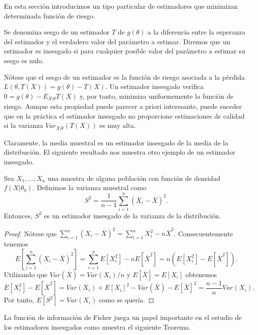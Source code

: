     En esta sección introducimos un tipo particular de estimadores que minimizan determinada función de riesgo.

    \begin{definition}
        Se denomina sesgo de un estimador $T$ de $g(\theta)$ a la diferencia entre la esperanza del estimador y el verdadero valor del parámetro a estimar. Diremos que un estimador es insesgado si para cualquier posible valor del parámetro a estimar su sesgo es nulo.
    \end{definition}

    Nótese que el sesgo de un estimador es la función de riesgo asociada a la pérdida $L(\theta,T(X)) = g(\theta) - T(X)$. Un estimador insesgado verifica $0 = g(\theta) - E_{X|\theta} T(X)$ y, por tanto, minimiza uniformemente la función de riesgo. Aunque esta propiedad puede parecer a priori interesante, puede suceder que en la práctica el estimador insesgado no proporcione estimaciones de calidad si la varianza $Var_{X|\theta}(T(X))$ es muy alta.

    Claramente, la media muestral es un estimador insesgado de la media de la distribución. El siguiente resultado nos muestra otro ejemplo de un estimador insesgado.

    \begin{prop}
        Sea $X_1, \ldots, X_n$ una muestra de alguna población con función de densidad $f(X | \theta_0)$. Definimos la varianza muestral como
        \[S^2 = \frac{1}{n-1}\sum_{i = 1}^n(X_i - \overline{X})^2.\]
        Entonces, $S^2$ es un estimador insesgado de la varianza de la distribución.
    \end{prop}
    \begin{proof}
        Nótese que $\sum_{i = 1}^n(X_i - \overline{X})^2 = \sum_{i = 1}^nX_i^2 - n\overline{X}^2$. Consecuentemente tenemos
        \[E\left[\sum_{i = 1}^n(X_i - \overline{X})^2\right] = \sum_{i = 1}^nE\left[X_i^2\right] -     nE[\overline{X}^2] = n(E\left[X_i^2\right] - E[\overline{X}^2]).\]
        Utilizando que $Var(\overline{X}) = Var(X_i) / n$ y $E[\overline{X}] = E[X_i]$ obtenemos
        \[E[X_i^2] - E[\overline{X}^2] = Var(X_i) + E[X_i]^2 - Var(\overline{X}) - E[\overline{X}]^2 = \frac{n-1}{n} Var(X_i).\]
        Por tanto, $E[S^2] = Var(X_i)$ como se quería.
    \end{proof}

    La función de información de Fisher juega un papel importante en el estudio de los estimadores insesgados como muestra el siguiente Teorema.

